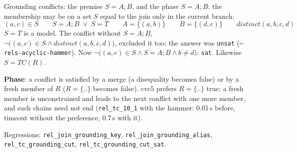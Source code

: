 \documentclass[aspectratio=169]{beamer}
\newcommand{\sm}[1]{\texttt{#1}}
\newcommand{\TC}{\mathit{TC}}
\begin{document}
\begin{frame}{Grounding conflicts: the premise $S = A;B$, and the phase}
  \small
  \textbf{$S = A;B$}: the membership may be on a set $S$ equal to the join only in the current
  branch:
  \[ (a,c)\in S \qquad S = A;B \;\lor\; S = T \qquad A = \{(a,b)\} \qquad B = \{(d,c)\} \qquad
     \mathit{distinct}(a,b,c,d) \]
  $S = T$ is a model. The conflict without $S = A;B$,
  $\neg\big((a,c)\in S \land \mathit{distinct}(a,b,c,d)\big)$, excluded it too: the answer was
  \sm{unsat} (\sm{--rels-acyclic-hammer}). Now
  $\neg\big((a,c)\in S \land S = A;B \land b\neq d\big)$: \sm{sat}. Likewise $S = \TC(R)$.
  \medskip

  \textbf{Phase}: a conflict is satisfied by a merge (a disequality becomes false) or by a fresh
  member of $R$ ($R = \{..\}$ becomes false). cvc5 prefers $R = \{..\}$ true: a fresh member is
  unconstrained and leads to the next conflict with one more member, and such chains need not end
  (\sm{rel\_tc\_10\_1} with the hammer: 0.01\,s before, timeout without the preference, 0.7\,s
  with it).
  \medskip

  Regressions: \sm{rel\_join\_grounding\_key}, \sm{rel\_join\_grounding\_alias},
  \sm{rel\_tc\_grounding\_cut}, \sm{rel\_tc\_grounding\_cut\_sat}.
\end{frame}
\end{document}
